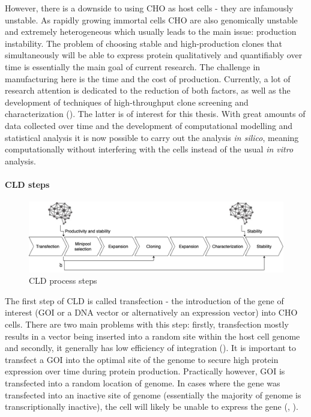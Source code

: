 However, there is a downside to using CHO as host cells - they are infamously unstable. As rapidly growing immortal cells CHO are also genomically unstable and extremely heterogeneous which usually leads to the main issue: production instability. The problem of choosing stable and high-production clones that simultaneously will be able to express protein qualitatively and quantifiably over time is essentially the main goal of current research. The challenge in manufacturing here is the time and the cost of production. Currently, a lot of research attention is dedicated to the reduction of both factors, as well as the development of techniques of high-throughput clone screening and characterization (\cite{Tihanyi_2020}). The latter is of interest for this thesis. With great amounts of data collected over time and the development of computational modelling and statistical analysis it is now possible to carry out the analysis \textit{in silico}, meaning computationally without interfering with the cells instead of the usual \textit{in vitro} analysis.

\paragraph{CLD steps}
\label{section:cld-steps}
\begin{figure}[H]
	\begin{center}
		\includegraphics[width=0.8\linewidth]{bilder/CLD.png}
		\caption{CLD process steps}\label{fig:cls-steps}
	\end{center}
\end{figure}

The first step of CLD is called transfection - the introduction of the gene of interest (GOI or a DNA vector or alternatively an expression vector) into CHO cells. There are two main problems with this step: firstly, transfection mostly results in a vector being inserted into a random site within the host cell genome and secondly, it generally has low efficiency of integration  (\cite{Tihanyi_2020}). It is important to transfect a GOI into the optimal site of the genome to secure high protein expression over time during protein production. Practically however, GOI is transfected into a random location of genome. In cases where the gene was transfected into an inactive site of genome (essentially the majority of genome is transcriptionally inactive), the cell will likely be unable to express the gene (\cite{Castan_2018}, \cite{Hong_2018}).

